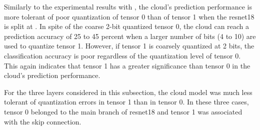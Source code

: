 Similarly to the experimental results with \soneunittworeluone, the cloud's prediction performance is more tolerant of poor quantization of tensor 0 than of tensor 1 when the \gls{resnet18} is split at \soneunittworelutwo. In spite of the coarse 2-bit quantized tensor 0, the cloud can reach a prediction accuracy of 25 to 45 percent when a larger number of bits (4 to 10) are used to quantize tensor 1.  However, if tensor 1 is coarsely quantized at 2 bits, the classification accuracy is poor regardless of the quantization level of tensor 0. This again indicates that tensor 1 has a greater significance than tensor 0 in the cloud's prediction performance. 

For the three layers considered in this subsection, the cloud model was much less tolerant of quantization errors in tensor 1 than in tensor 0. In these three cases, tensor 0 belonged to the main branch of \gls{resnet18} and tensor 1 was associated with the skip connection.

%
%

